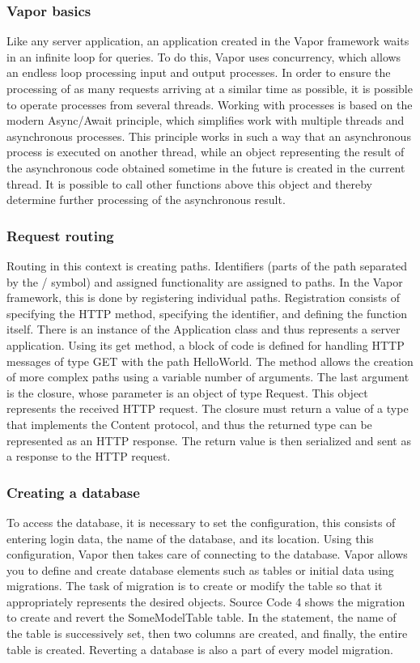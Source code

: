 \documentclass[
  biblatex = false,
  language=english,
  figures=false,
  sourcecodes,
  glossaries,
  index
]{kidiplom}
\begin{document}
\subsubsection{Vapor basics}
Like any server application, an application created in the Vapor framework \cite{bib5} waits in an infinite loop for queries. To do this, Vapor uses concurrency, which allows an endless loop processing input and output processes. In order to ensure the processing of as many requests arriving at a similar time as possible, it is possible to operate processes from several threads. Working with processes is based on the modern Async/Await principle, which simplifies work with multiple threads and asynchronous processes.
This principle works in such a way that an asynchronous process is executed on another thread, while an object representing the result of the asynchronous code obtained sometime in the future is created in the current thread. It is possible to call other functions above this object and thereby determine further processing of the asynchronous result.

\subsubsection{Request routing}
Routing in this context is creating paths. Identifiers (parts of the path separated by the / symbol) and assigned functionality are assigned to paths. In the Vapor framework, this is done by registering individual paths. Registration consists of specifying the HTTP method, specifying the identifier, and defining the function itself.
There is an instance of the Application class and thus represents a server application. Using its get method, a block of code is defined for handling HTTP messages of type GET with the path HelloWorld. The method allows the creation of more complex paths using a variable number of arguments. The last argument is the closure, whose parameter is an object of type Request. This object represents the received HTTP request. The closure must return a value of a type that implements the Content protocol, and thus the returned type can be represented as an HTTP response. The return value is then serialized and sent as a response to the HTTP request.

\subsubsection{Creating a database}
To access the database, it is necessary to set the configuration, this consists of entering login data, the name of the database, and its location. Using this configuration, Vapor then takes care of connecting to the database. Vapor allows you to define and create database elements such as tables or initial data using migrations. The task of migration is to create or modify the table so that it appropriately represents the desired objects. Source Code 4 shows the migration to create and revert the SomeModelTable table. In the statement, the name of the table is successively set, then two columns are created, and finally, the entire table is created. Reverting a database is also a part of every model migration.
\end{document}
